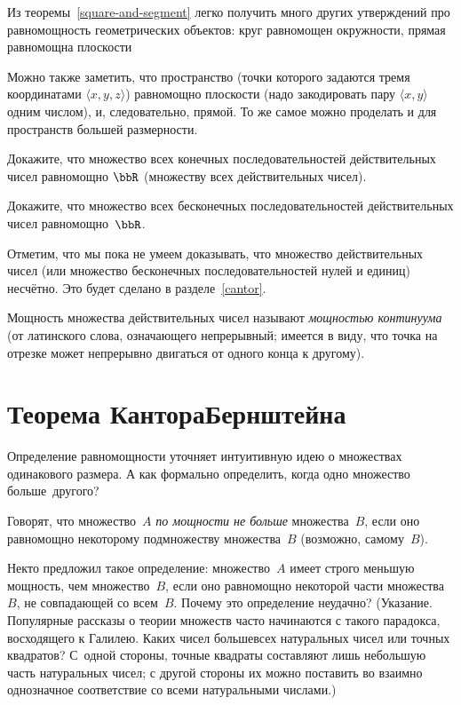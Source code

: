 Из теоремы~\ref{square-and-segment}
легко получить много других утверждений
про равномощность геометрических объектов: круг равномощен
окружности, прямая равномощна плоскости 

Можно также заметить, что пространство (точки которого задаются
тремя координатами $\langle x,y,z\rangle$) равномощно плоскости (надо
закодировать пару $\langle x,y\rangle$ одним числом), и, следовательно,
прямой. То же самое можно проделать и для
пространств большей размерности.

\begin{problem}
Докажите, что множество всех конечных последовательностей
действительных чисел равномощно $\bbR$\index{$\bbR$} (множеству всех
действительных чисел).
\end{problem}

\begin{problem}
Докажите, что множество всех бесконечных последовательностей
действительных чисел равномощно~$\bbR$.
\end{problem}

Отметим, что мы пока не умеем доказывать, что множество
действительных чисел (или множество бесконечных последовательностей
нулей и единиц) несчётно. Это будет сделано в
разделе~\ref{cantor}.

Мощность множества действительных чисел называют \emph{мощностью
континуума}
(от латинского слова, означающего  непрерывный;
имеется в виду, что точка на отрезке может непрерывно
двигаться от одного конца к другому).

\section{Теорема Кантора\texorpdfstring{\ч}{--}Бернштейна}
        \label{cantor-bernstein}

Определение равномощности уточняет интуитивную идею о множествах
 одинакового размера. А как формально определить, когда
одно множество  больше\ другого?

\label{card-inequality-def}%
Говорят, что множество~$A$ \emph{по мощности не больше}%
множества~$B$, если оно равномощно некоторому подмножеству
множества~$B$ (возможно, самому~$B$).

\begin{problem}
Некто предложил такое определение: множество~$A$ имеет строго
меньшую мощность, чем множество~$B$, если оно равномощно
некоторой части множества~$B$, не совпадающей со всем~$B$.
Почему это определение неудачно?
(Указание. Популярные рассказы о теории множеств часто начинаются с такого
парадокса, восходящего к Галилею.
Каких чисел больше\т всех натуральных чисел или точных квадратов? С~одной
стороны, точные квадраты составляют лишь небольшую часть
натуральных чисел; с другой стороны их можно поставить во
взаимно однозначное соответствие со всеми натуральными числами.)
\end{problem}


